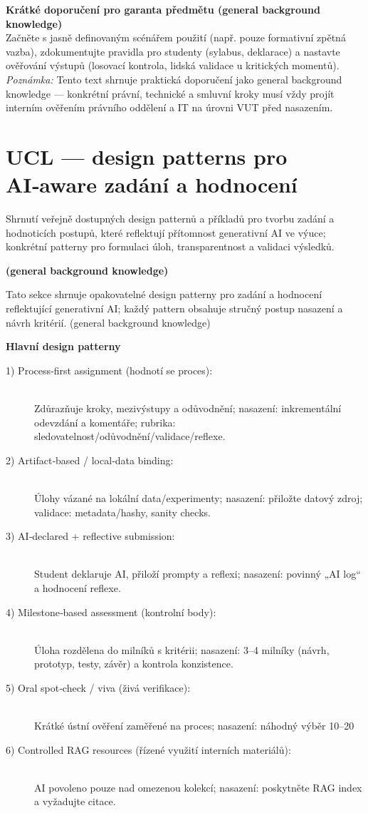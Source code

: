 \documentclass{report}%
\begin{document}
\medskip
\textbf{Krátké doporučení pro garanta předmětu (general background knowledge)}\\
Začněte s jasně definovaným scénářem použití (např. pouze formativní zpětná vazba), zdokumentujte pravidla pro studenty (sylabus, deklarace) a nastavte ověřování výstupů (losovací kontrola, lidská validace u kritických momentů).
\medskip
\textit{Poznámka:} Tento text shrnuje praktická doporučení jako general background knowledge — konkrétní právní, technické a smluvní kroky musí vždy projít interním ověřením právního oddělení a IT na úrovni VUT před nasazením.%

%
\section{UCL — design patterns pro AI‑aware zadání a hodnocení}%
Shrnutí veřejně dostupných design patternů a příkladů pro tvorbu zadání a hodnoticích postupů, které reflektují přítomnost generativní AI ve výuce; konkrétní patterny pro formulaci úloh, transparentnost a validaci výsledků.%


%
\textbf{(general background knowledge)}\par
Tato sekce shrnuje opakovatelné design patterny pro zadání a hodnocení reflektující generativní AI; každý pattern obsahuje stručný postup nasazení a návrh kritérií. (general background knowledge)

\medskip
\textbf{Hlavní design patterny}
\begin{description}
  \item[1) Process‑first assignment (hodnotí se proces):] \hfill \\
    Zdůrazňuje kroky, mezivýstupy a odůvodnění; nasazení: inkrementální odevzdání a komentáře; rubrika: sledovatelnost/odůvodnění/validace/reflexe.
  \item[2) Artifact‑based / local‑data binding:] \hfill \\
    Úlohy vázané na lokální data/experimenty; nasazení: přiložte datový zdroj; validace: metadata/hashy, sanity checks.
  \item[3) AI‑declared + reflective submission:] \hfill \\
    Student deklaruje AI, přiloží prompty a reflexi; nasazení: povinný „AI log“ a hodnocení reflexe.
  \item[4) Milestone‑based assessment (kontrolní body):] \hfill \\
    Úloha rozdělena do milníků s kritérii; nasazení: 3–4 milníky (návrh, prototyp, testy, závěr) a kontrola konzistence.
  \item[5) Oral spot‑check / viva (živá verifikace):] \hfill \\
    Krátké ústní ověření zaměřené na proces; nasazení: náhodný výběr 10–20 %
  \item[6) Controlled RAG resources (řízené využití interních materiálů):] \hfill \\
    AI povoleno pouze nad omezenou kolekcí; nasazení: poskytněte RAG index a vyžadujte citace.
\end{description}
\end{document}
